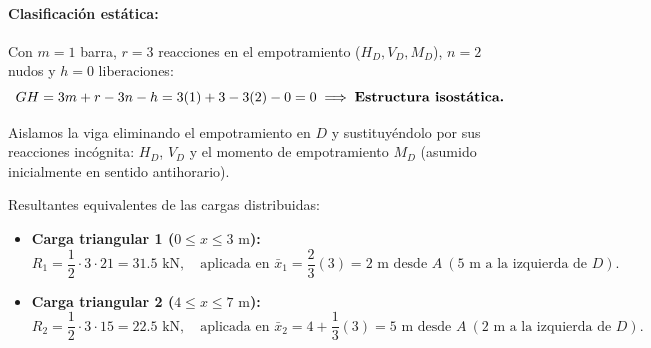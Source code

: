 \paragraph{Clasificación estática:}
Con $m = 1$ barra, $r = 3$ reacciones en el empotramiento ($H_D, V_D, M_D$), $n = 2$ nudos y $h = 0$ liberaciones:
\begin{equation}
    GH = 3m + r - 3n - h = 3(1) + 3 - 3(2) - 0 = 0 \implies \text{\textbf{Estructura isostática.}}
\end{equation}


Aislamos la viga eliminando el empotramiento en $D$ y sustituyéndolo por sus reacciones incógnita: $H_D$, $V_D$ y el momento de empotramiento $M_D$ (asumido inicialmente en sentido antihorario).

Resultantes equivalentes de las cargas distribuidas:
\begin{itemize}
    \item \textbf{Carga triangular 1 ($0 \le x \le 3\text{ m}$):}
          \begin{equation}
              R_1 = \frac{1}{2} \cdot 3 \cdot 21 = 31.5\text{ kN}, \quad \text{aplicada en } \bar{x}_1 = \frac{2}{3}(3) = 2\text{ m desde } A \ (5\text{ m a la izquierda de } D).
          \end{equation}
    \item \textbf{Carga triangular 2 ($4 \le x \le 7\text{ m}$):}
          \begin{equation}
              R_2 = \frac{1}{2} \cdot 3 \cdot 15 = 22.5\text{ kN}, \quad \text{aplicada en } \bar{x}_2 = 4 + \frac{1}{3}(3) = 5\text{ m desde } A \ (2\text{ m a la izquierda de } D).
          \end{equation}
\end{itemize}

